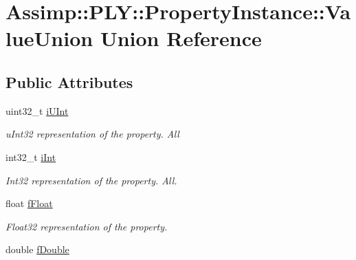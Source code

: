 \hypertarget{union_assimp_1_1_p_l_y_1_1_property_instance_1_1_value_union}{\section{Assimp\+:\+:P\+L\+Y\+:\+:Property\+Instance\+:\+:Value\+Union Union Reference}
\label{union_assimp_1_1_p_l_y_1_1_property_instance_1_1_value_union}
}
\subsection*{Public Attributes}
\begin{DoxyCompactItemize}
\item 
\hypertarget{union_assimp_1_1_p_l_y_1_1_property_instance_1_1_value_union_a2f4427fd7ec1a8f4c994b671fa4336ae}{uint32\+\_\+t \hyperlink{union_assimp_1_1_p_l_y_1_1_property_instance_1_1_value_union_a2f4427fd7ec1a8f4c994b671fa4336ae}{i\+U\+Int}}\label{union_assimp_1_1_p_l_y_1_1_property_instance_1_1_value_union_a2f4427fd7ec1a8f4c994b671fa4336ae}

\begin{DoxyCompactList}\small\item\em u\+Int32 representation of the property. All \end{DoxyCompactList}\item 
\hypertarget{union_assimp_1_1_p_l_y_1_1_property_instance_1_1_value_union_a3bdb893b18b94a14c7439f1256c127c9}{int32\+\_\+t \hyperlink{union_assimp_1_1_p_l_y_1_1_property_instance_1_1_value_union_a3bdb893b18b94a14c7439f1256c127c9}{i\+Int}}\label{union_assimp_1_1_p_l_y_1_1_property_instance_1_1_value_union_a3bdb893b18b94a14c7439f1256c127c9}

\begin{DoxyCompactList}\small\item\em Int32 representation of the property. All. \end{DoxyCompactList}\item 
\hypertarget{union_assimp_1_1_p_l_y_1_1_property_instance_1_1_value_union_abe33489f27bf75cd306b95d7e49bdd15}{float \hyperlink{union_assimp_1_1_p_l_y_1_1_property_instance_1_1_value_union_abe33489f27bf75cd306b95d7e49bdd15}{f\+Float}}\label{union_assimp_1_1_p_l_y_1_1_property_instance_1_1_value_union_abe33489f27bf75cd306b95d7e49bdd15}

\begin{DoxyCompactList}\small\item\em Float32 representation of the property. \end{DoxyCompactList}\item 
\hypertarget{union_assimp_1_1_p_l_y_1_1_property_instance_1_1_value_union_acd084b45509f1c00d0ac2e43816f5427}{double \hyperlink{union_assimp_1_1_p_l_y_1_1_property_instance_1_1_value_union_acd084b45509f1c00d0ac2e43816f5427}{f\+Double}}\label{union_assimp_1_1_p_l_y_1_1_property_instance_1_1_value_union_acd084b45509f1c00d0ac2e43816f5427}


\end{DoxyCompactItemize}

